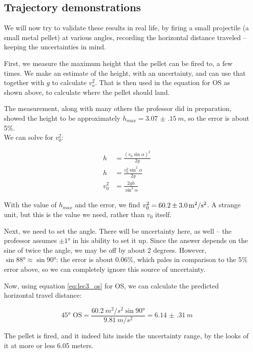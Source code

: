 \documentclass[8.01x]{subfiles}
\begin{document}
\subsection{Trajectory demonstrations}

We will now try to validate these results in real life, by firing a small projectile (a small metal pellet) at various angles, recording the horizontal distance traveled -- keeping the uncertainties in mind.

First, we measure the maximum height that the pellet can be fired to, a few times. We make an estimate of the height, with an uncertainty, and can use that together with $g$ to calculate $v_o^2$. That is then used in the equation for OS as shown above, to calculate where the pellet should land.

The measurement, along with many others the professor did in preparation, showed the height to be approximately $h_{max} = \SI{3.07(15)}{m}$, so the error is about 5\%.\\
We can solve for $v_0^2$:

\begin{align}
h &= \frac{(v_0 \sin \alpha)^2}{2g}\\
h &= \frac{v_0^2 \sin^2 \alpha}{2g}\\
v_0^2 &= \frac{2gh}{\sin^2 \alpha}
\end{align}

With the value of $h_{max}$ and the error, we find $v_0^2 = \SI{60.2 \pm 3}{m^2/s^2}$. A strange unit, but this is the value we need, rather than $v_0$ itself.

Next, we need to set the angle. There will be uncertainty here, as well -- the professor assumes $\pm \ang{1}$ in his ability to set it up. Since the answer depends on the sine of twice the angle, we may be off by about 2 degrees. However, $\sin{\ang{88}} \approx \sin{\ang{90}}$: the error is about 0.06\%, which pales in comparison to the 5\% error above, so we can completely ignore this source of uncertainty.

Now, using equation \eqref{eq:lec3_os} for OS, we can calculate the predicted horizontal travel distance:

\begin{equation}
\ang{45}\text{ OS} = \frac{\SI{60.2}{m^2/s^2} \sin \ang{90}}{\SI{9.81}{m/s^2}} = \SI{6.14(31)}{m}
\end{equation}

The pellet is fired, and it indeed hits inside the uncertainty range, by the looks of it at more or less 6.05 meters.
\end{document}
